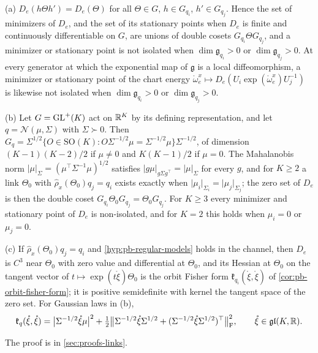 (a) $D_e(h\Theta h')=D_e(\Theta)$ for all $\Theta\in G$, $h\in G_{q_i}$, $h'\in G_{q_j}$. Hence the set of
minimizers of $D_e$, and the set of its stationary points when $D_e$ is finite and continuously
differentiable on $G$, are unions of double cosets $G_{q_i}\Theta G_{q_j}$, and a minimizer or stationary
point is not isolated when $\dim\mathfrak g_{q_i}>0$ or $\dim\mathfrak g_{q_j}>0$. At every generator at which
the exponential map of $\mathfrak g$ is a local diffeomorphism, a minimizer or stationary point of the chart
energy $\mathring\omega^x_e\mapsto D_e(U_i\exp(\mathring\omega^x_e)U_j^{-1})$ is likewise not isolated when
$\dim\mathfrak g_{q_i}>0$ or $\dim\mathfrak g_{q_j}>0$.

(b) Let $G=\mathrm{GL}^+(K)$ act on $\mathbb R^K$ by its defining representation, and let
$q=\mathcal N(\mu,\Sigma)$ with $\Sigma\succ0$. Then
$G_q=\Sigma^{1/2}\{O\in\mathrm{SO}(K):O\Sigma^{-1/2}\mu=\Sigma^{-1/2}\mu\}\Sigma^{-1/2}$, of dimension
$(K-1)(K-2)/2$ if $\mu\neq0$ and $K(K-1)/2$ if $\mu=0$. The Mahalanobis norm
$\lvert\mu\rvert_\Sigma=(\mu^\top\Sigma^{-1}\mu)^{1/2}$ satisfies
$\lvert g\mu\rvert_{g\Sigma g^\top}=\lvert\mu\rvert_\Sigma$ for every $g$, and for $K\geq2$ a link $\Theta_0$ with
$\widehat\rho_x(\Theta_0)q_j=q_i$ exists exactly when $\lvert\mu_i\rvert_{\Sigma_i}=\lvert\mu_j\rvert_{\Sigma_j}$; the zero
set of $D_e$ is then the double coset $G_{q_i}\Theta_0G_{q_j}=\Theta_0G_{q_j}$. For $K\geq3$ every minimizer and
stationary point of $D_e$ is non-isolated, and for $K=2$ this holds when $\mu_i=0$ or $\mu_j=0$.

(c) If $\widehat\rho_x(\Theta_0)q_j=q_i$ and \cref{hyp:pb-regular-models} holds in the channel, then $D_e$ is
$C^3$ near $\Theta_0$ with zero value and differential at $\Theta_0$, and its Hessian at $\Theta_0$ on the
tangent vector of $t\mapsto\exp(t\mathring\xi)\Theta_0$ is the orbit Fisher form $\mathfrak k_{q_i}(\mathring\xi,\mathring\xi)$ of
\cref{cor:pb-orbit-fisher-form}; it is positive semidefinite with kernel the tangent space of the zero set.
For Gaussian laws in (b),
\begin{equation}
\mathfrak k_q(\mathring\xi,\mathring\xi)=\bigl\lvert\Sigma^{-1/2}\mathring\xi\mu\bigr\rvert^2
+\tfrac12\bigl\lVert\Sigma^{-1/2}\mathring\xi\Sigma^{1/2}+(\Sigma^{-1/2}\mathring\xi\Sigma^{1/2})^\top\bigr\rVert_{\mathrm F}^2,
\qquad\mathring\xi\in\mathfrak{gl}(K,\mathbb R).
\label{eq:link-gaussian-orbit-form}
\end{equation}

The proof is in \cref{sec:proofs-links}.


